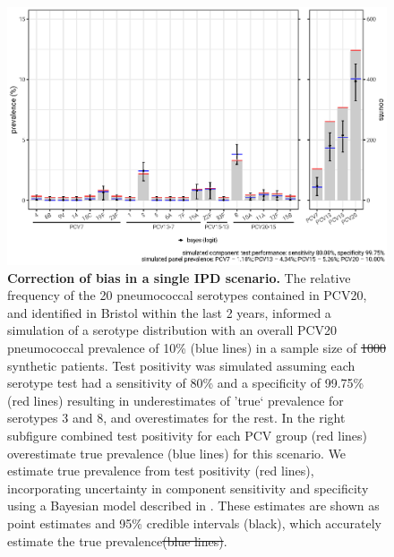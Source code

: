 \documentclass[10pt,letterpaper]{article}
\providecommand{\DIFaddtex}[1]{{\protect\color{blue}\uwave{#1}}} %
\providecommand{\DIFdeltex}[1]{{\protect\color{red}\sout{#1}}}                      %
\providecommand{\DIFdelbegin}{} %
\providecommand{\DIFaddFL}[1]{\DIFadd{#1}} %
\providecommand{\DIFdelFL}[1]{\DIFdel{#1}} %
\providecommand{\DIFaddbeginFL}{} %
\providecommand{\DIFaddendFL}{} %
\providecommand{\DIFdelbeginFL}{} %
\providecommand{\DIFdelendFL}{} %
\providecommand{\DIFadd}[1]{\texorpdfstring{\DIFaddtex{#1}}{#1}} %
\providecommand{\DIFdel}[1]{\texorpdfstring{\DIFdeltex{#1}}{}} %
\newcommand{\DIFscaledelfig}{0.5}
\newlength{\DIFdelgraphicswidth} %
\newlength{\DIFdelgraphicsheight} %
\newcommand{\DIFaddincludegraphics}[2][]{{\color{blue}\fbox{\DIFOincludegraphics[#1]{#2}}}} %
\newcommand{\DIFdelincludegraphics}[2][]{%
\sbox{\DIFdelgraphicsbox}{\DIFOincludegraphics[#1]{#2}}%
\settoboxwidth{\DIFdelgraphicswidth}{\DIFdelgraphicsbox} %
\settoboxtotalheight{\DIFdelgraphicsheight}{\DIFdelgraphicsbox} %
\scalebox{\DIFscaledelfig}{%
\parbox[b]{\DIFdelgraphicswidth}{\usebox{\DIFdelgraphicsbox}\\[-\baselineskip] \rule{\DIFdelgraphicswidth}{0em}}\llap{\resizebox{\DIFdelgraphicswidth}{\DIFdelgraphicsheight}{%
\setlength{\unitlength}{\DIFdelgraphicswidth}%
\begin{picture}(1,1)%
\thicklines\linethickness{2pt} %
{\color[rgb]{1,0,0}\put(0,0){\framebox(1,1){}}}%
{\color[rgb]{1,0,0}\put(0,0){\line( 1,1){1}}}%
{\color[rgb]{1,0,0}\put(0,1){\line(1,-1){1}}}%
\end{picture}%
}\hspace*{3pt}}} %
} %
\DeclareRobustCommand{\DIFdelbegin}{\DIFOdelbegin \let\includegraphics\DIFdelincludegraphics} %
\DeclareRobustCommand{\DIFaddbeginFL}{\DIFOaddbeginFL \let\includegraphics\DIFaddincludegraphics} %
\DeclareRobustCommand{\DIFaddendFL}{\DIFOaddendFL \let\includegraphics\DIFOincludegraphics} %
\DeclareRobustCommand{\DIFdelbeginFL}{\DIFOdelbeginFL \let\includegraphics\DIFdelincludegraphics} %
\DeclareRobustCommand{\DIFdelendFL}{\DIFOaddendFL \let\includegraphics\DIFOincludegraphics} %
\begin{document}
\DIFdelbegin %
\DIFdelendFL \DIFaddbeginFL \begin{figure}[hb!]
\centerline{\includegraphics[width = \textwidth]{fig/fig5-simulation-result-bayes-v2.eps}}
\DIFaddendFL \caption{{\bf Correction of bias in a single IPD scenario.}
The relative frequency of the 20 pneumococcal serotypes contained in PCV20, and identified in Bristol within the last 2 years, informed a simulation of a serotype distribution with an overall PCV20 pneumococcal prevalence of 10\% (blue lines) in a sample size of \DIFdelbeginFL \DIFdelFL{1000 }\DIFdelendFL \DIFaddbeginFL \DIFaddFL{4000 }\DIFaddendFL synthetic patients. Test positivity was simulated assuming each serotype test had a sensitivity of 80\% and a specificity of 99.75\% (red lines) resulting in underestimates of 'true` prevalence for serotypes 3 and 8, and overestimates for the rest. In the right subfigure combined test positivity for each PCV group (red lines) overestimate true prevalence (blue lines) for this scenario. We estimate true prevalence from test positivity (red lines), incorporating uncertainty in component sensitivity and specificity using a Bayesian model described in . These estimates are shown as point estimates and 95\% credible intervals (black), which accurately estimate the true prevalence\DIFdelbeginFL \DIFdelFL{(blue lines)}\DIFdelendFL .}
\label{fig5}
\end{figure}
\end{document}
